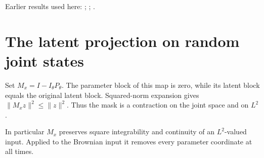 \documentclass[11pt,a4paper]{article}
\begin{document}
Earlier results used here: \cite[Section~3.1.1]{LangevinLean2026IPLA}; \cite[Section~3.3.1]{LangevinLean2026IPLA}; \cite[Section~3.9.1]{LangevinLean2026IPLA}.

\section{\texorpdfstring{The latent projection on random joint states}{The latent projection on random joint states}}


Set \(M_x=I-I_\theta P_\theta\). The parameter block of this map is zero, while its latent block equals the original latent block. Squared-norm expansion gives \(\|M_xz\|^2\le\|z\|^2\). Thus the mask is a contraction on the joint space and on \(L^2\).



In particular \(M_x\) preserves square integrability and continuity of an \(L^2\)-valued input. Applied to the Brownian input it removes every parameter coordinate at all times.
\end{document}
